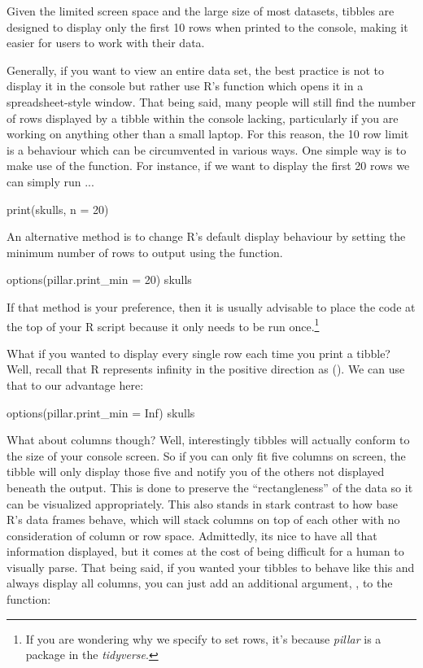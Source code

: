 Given the limited screen space and the large size of most datasets, tibbles are designed to display only the first 10 rows when printed to the console, making it easier for users to work with their data.

Generally, if you want to view an entire data set, the best practice is not to display it in the console but rather use R's  function which opens it in a spreadsheet-style window. That being said, many people will still find the number of rows displayed by a tibble within the console lacking, particularly if you are working on anything other than a small laptop. For this reason, the 10 row limit is a behaviour which can be circumvented in various ways. One simple way is to make use of the  function. For instance, if we want to display the first 20 rows we can simply run ...

\begin{inR}
print(skulls, n = 20)
\end{inR}

\vspace{1em}

An alternative method is to change R's default display behaviour by setting the minimum number of rows to output using the  function.

\begin{inR}
options(pillar.print_min = 20)
skulls
\end{inR}

\vspace{1em}

\noindent
If that method is your preference, then it is usually advisable to place the  code at the top of your R script because it only needs to be run once.\footnote{If you are wondering why we specify  to set rows, it's because \textit{pillar} is a package in the \textit{tidyverse}.}

What if you wanted to display every single row each time you print a tibble? Well, recall that R represents infinity in the positive direction as (). We can use that to our advantage here:

\begin{inR}
options(pillar.print_min = Inf)
skulls
\end{inR}

\vspace{1em}

What about columns though? Well, interestingly tibbles will actually conform to the size of your console screen.  So if you can only fit five columns on screen, the tibble will only display those five and notify you of the others not displayed beneath the output. This is done to preserve the ``rectangleness'' of the data so it can be visualized appropriately. This also stands in stark contrast to how base R's data frames behave, which will stack columns on top of each other with no consideration of column or row space. Admittedly, its nice to have all that information displayed, but it comes at the cost of being difficult for a human to visually parse. That being said, if you wanted your tibbles to behave like this and always display all columns, you can just add an additional argument, , to the  function:

